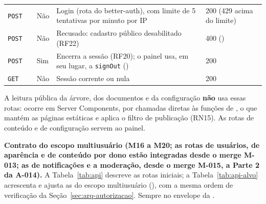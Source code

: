 \begin{longtable}{@{}L{1.5cm}L{3.9cm}L{1.6cm}L{4.4cm}L{2.4cm}@{}}
\texttt{POST} &  & Não & Login (rota do better-auth), com limite de 5 tentativas por minuto por IP & 200 (429 acima do limite)\\[1pt]
\texttt{POST} &  & Não & Recusado: cadastro público desabilitado (RF22) & 400 ()\\[1pt]
\texttt{POST} &  & Sim & Encerra a sessão (RF20); o painel usa, em seu lugar, a  \texttt{signOut} () & 200\\[1pt]
\texttt{GET} &  & Não & Sessão corrente ou nula & 200\\[1pt]
\end{longtable}

A leitura pública da árvore, dos documentos e da configuração \textbf{não} usa essas rotas: ocorre em Server Components, por chamadas diretas às funções de , o que mantém as páginas estáticas e aplica o filtro de publicação (RN15). As rotas de conteúdo e de configuração servem ao painel.

\textbf{Contrato do escopo multiusuário (M16 a M20; as rotas de usuários, de aparência e de conteúdo por dono estão integradas desde o merge M-013; as de notificações e a moderação, desde o merge M-015, a Parte 2 da A-014).} A Tabela~\ref{tab:api} descreve as rotas iniciais; a Tabela~\ref{tab:api-alvo} acrescenta e ajusta as do escopo multiusuário (), com a mesma ordem de verificação da Seção~\ref{sec:arq-autorizacao}. Sempre no envelope da .

